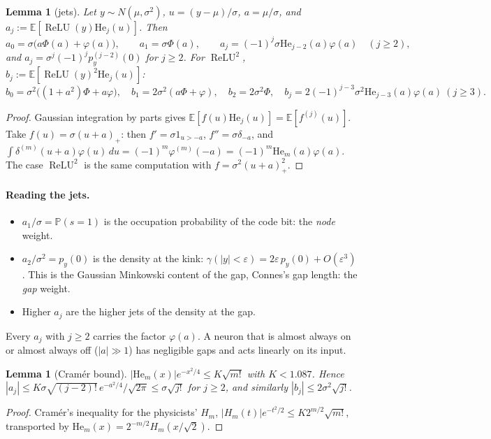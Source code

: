 \documentclass[11pt]{article}
\newtheorem{lemma}[theorem]{Lemma}
\theoremstyle{definition}
\theoremstyle{remark}
\newcommand{\E}{\mathbb E}
\newcommand{\He}{\mathrm{He}}
\newcommand{\relu}{\operatorname{ReLU}}
\begin{document}
\begin{lemma}[jets]\label{lem:jets}
Let $y\sim N(\mu,\sigma^2)$, $u=(y-\mu)/\sigma$, $a=\mu/\sigma$, and $a_j:=\E[\relu(y)\He_j(u)]$. Then
\[
a_0=\sigma\big(a\Phi(a)+\varphi(a)\big),\qquad a_1=\sigma\Phi(a),\qquad a_j=(-1)^j\sigma\He_{j-2}(a)\varphi(a)\quad(j\ge2),
\]
and $a_j=\sigma^j(-1)^jp_y^{(j-2)}(0)$ for $j\ge2$. For $\relu^2$, $b_j:=\E[\relu(y)^2\He_j(u)]$:
\[
b_0=\sigma^2\big((1+a^2)\Phi+a\varphi\big),\quad b_1=2\sigma^2(a\Phi+\varphi),\quad b_2=2\sigma^2\Phi,\quad b_j=2(-1)^{j-3}\sigma^2\He_{j-3}(a)\varphi(a)\ (j\ge3).
\]
\end{lemma}

\begin{proof}
Gaussian integration by parts gives $\E[f(u)\He_j(u)]=\E[f^{(j)}(u)]$. Take $f(u)=\sigma(u+a)_+$: then $f'=\sigma1_{u>-a}$, $f''=\sigma\delta_{-a}$, and $\int\delta^{(m)}(u+a)\varphi(u)\,du=(-1)^m\varphi^{(m)}(-a)=(-1)^m\He_m(a)\varphi(a)$. The case $\relu^2$ is the same computation with $f=\sigma^2(u+a)_+^2$.
\end{proof}

\paragraph{Reading the jets.}
\begin{itemize}
\item $a_1/\sigma=\mathbb P(s=1)$ is the occupation probability of the code bit: the \emph{node} weight.
\item $a_2/\sigma^2=p_y(0)$ is the density at the kink: $\gamma(|y|<\varepsilon)=2\varepsilon\,p_y(0)+O(\varepsilon^3)$. This is the Gaussian Minkowski content of the gap, Connes's gap length: the \emph{gap} weight.
\item Higher $a_j$ are the higher jets of the density at the gap.
\end{itemize}
Every $a_j$ with $j\ge2$ carries the factor $\varphi(a)$. A neuron that is almost always on or almost always off ($|a|\gg1$) has negligible gaps and acts linearly on its input.

\begin{lemma}[Cram\'er bound]\label{lem:cramer}
$|\He_m(x)|e^{-x^2/4}\le K\sqrt{m!}$ with $K<1.087$. Hence $|a_j|\le K\sigma\sqrt{(j-2)!}\,e^{-a^2/4}/\sqrt{2\pi}\le\sigma\sqrt{j!}$ for $j\ge2$, and similarly $|b_j|\le2\sigma^2\sqrt{j!}$.
\end{lemma}

\begin{proof}
Cram\'er's inequality for the physicists' $H_m$, $|H_m(t)|e^{-t^2/2}\le K2^{m/2}\sqrt{m!}$, transported by $\He_m(x)=2^{-m/2}H_m(x/\sqrt2)$.
\end{proof}
\end{document}
